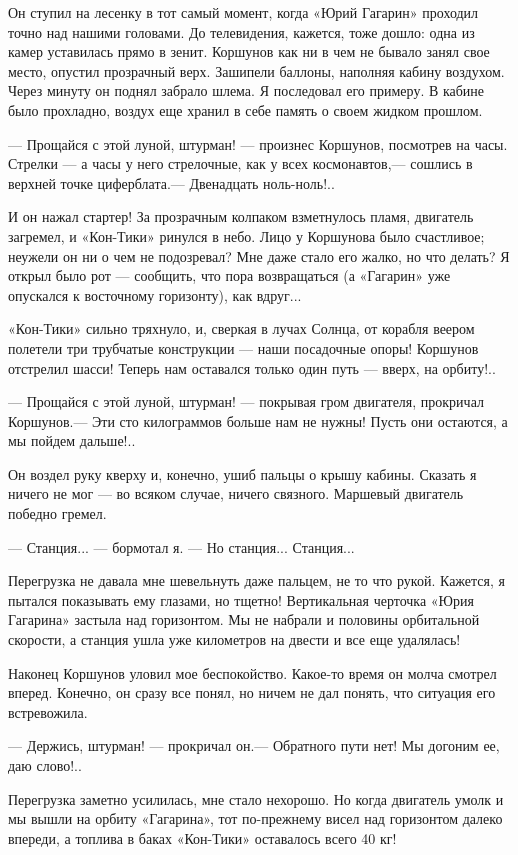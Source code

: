 \documentclass[11pt,a4paper,oneside]{article}
\begin{document}
Он ступил на лесенку в тот самый момент, когда «Юрий Гагарин» проходил точно над нашими головами. До телевидения, кажется, тоже дошло: одна из камер уставилась прямо в зенит. Коршунов как ни в чем не бывало занял свое место, опустил прозрачный верх. Зашипели баллоны, наполняя кабину воздухом. Через минуту он поднял забрало шлема. Я последовал его примеру. В кабине было прохладно, воздух еще хранил в себе память о своем жидком прошлом.

— Прощайся с этой луной, штурман! — произнес Коршунов, посмотрев на часы. Стрелки — а часы у него стрелочные, как у всех космонавтов,— сошлись в верхней точке циферблата.— Двенадцать ноль-ноль!..

И он нажал стартер! За прозрачным колпаком взметнулось пламя, двигатель загремел, и «Кон-Тики» ринулся в небо. Лицо у Коршунова было счастливое; неужели он ни о чем не подозревал? Мне даже стало его жалко, но что делать? Я открыл было рот — сообщить, что пора возвращаться (а «Гагарин» уже опускался к восточному горизонту), как вдруг...

«Кон-Тики» сильно тряхнуло, и, сверкая в лучах Солнца, от корабля веером полетели три трубчатые конструкции — наши посадочные опоры! Коршунов отстрелил шасси! Теперь нам оставался только один путь — вверх, на орбиту!..

— Прощайся с этой луной, штурман! — покрывая гром двигателя, прокричал Коршунов.— Эти сто килограммов больше нам не нужны! Пусть они остаются, а мы пойдем дальше!..

Он воздел руку кверху и, конечно, ушиб пальцы о крышу кабины. Сказать я ничего не мог — во всяком случае, ничего связного. Маршевый двигатель победно гремел.

— Станция... — бормотал я. — Но станция... Станция...

Перегрузка не давала мне шевельнуть даже пальцем, не то что рукой. Кажется, я пытался показывать ему глазами, но тщетно! Вертикальная черточка «Юрия Гагарина» застыла над горизонтом. Мы не набрали и половины орбитальной скорости, а станция ушла уже километров на двести и все еще удалялась!

Наконец Коршунов уловил мое беспокойство. Какое-то время он молча смотрел вперед. Конечно, он сразу все понял, но ничем не дал понять, что ситуация его встревожила.

— Держись, штурман! — прокричал он.— Обратного пути нет! Мы догоним ее, даю слово!..

Перегрузка заметно усилилась, мне стало нехорошо. Но когда двигатель умолк и мы вышли на орбиту «Гагарина», тот по-прежнему висел над горизонтом далеко впереди, а топлива в баках «Кон-Тики» оставалось всего 40 кг!
\end{document}
